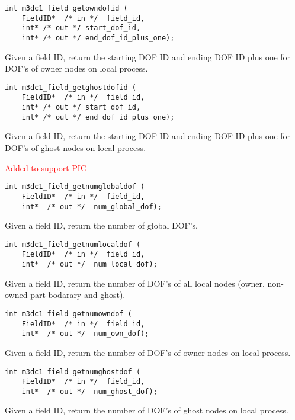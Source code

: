 \begin{verbatim}
int m3dc1_field_getowndofid (
    FieldID*  /* in */  field_id, 
    int* /* out */ start_dof_id, 
    int* /* out */ end_dof_id_plus_one); 
\end{verbatim}\vspace{-.5cm}\hspace{1cm}
Given a field ID, return the starting DOF ID and ending DOF ID plus one for DOF's of owner nodes on local process.

\begin{verbatim}
int m3dc1_field_getghostdofid (
    FieldID*  /* in */  field_id, 
    int* /* out */ start_dof_id, 
    int* /* out */ end_dof_id_plus_one); 
\end{verbatim}\vspace{-.5cm}\hspace{1cm}
Given a field ID, return the starting DOF ID and ending DOF ID plus one for DOF's of ghost nodes on local process.

\textcolor{red}{Added to support PIC}

\begin{verbatim}
int m3dc1_field_getnumglobaldof (
    FieldID*  /* in */  field_id, 
    int*  /* out */  num_global_dof);
\end{verbatim}\vspace{-.5cm}\hspace{1cm}
Given a field ID, return the number of global DOF's.

\begin{verbatim}
int m3dc1_field_getnumlocaldof (
    FieldID*  /* in */  field_id, 
    int*  /* out */  num_local_dof);
\end{verbatim}\vspace{-.5cm}\hspace{1cm}
Given a field ID, return the number of DOF's of all local nodes (owner, non-owned part bodarary and ghost).

\begin{verbatim}
int m3dc1_field_getnumowndof (
    FieldID*  /* in */  field_id, 
    int*  /* out */  num_own_dof);
\end{verbatim}\vspace{-.5cm}\hspace{1cm}
Given a field ID, return the number of DOF's of owner nodes on local process.

\begin{verbatim}
int m3dc1_field_getnumghostdof (
    FieldID*  /* in */  field_id, 
    int*  /* out */  num_ghost_dof);
\end{verbatim}\vspace{-.5cm}\hspace{1cm}
Given a field ID, return the number of DOF's of ghost nodes on local process. 

